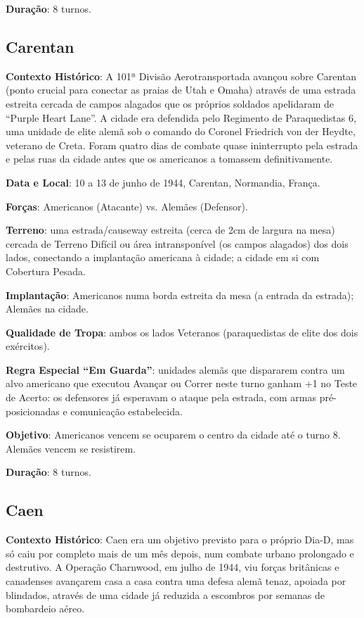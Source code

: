 \documentclass[11pt]{article}
\begin{document}
\textbf{Duração}: 8 turnos.

\subsection{Carentan}

\textbf{Contexto Histórico}: A 101ª Divisão Aerotransportada avançou sobre Carentan (ponto crucial para conectar as praias de Utah e Omaha) através de uma estrada estreita cercada de campos alagados que os próprios soldados apelidaram de ``Purple Heart Lane''. A cidade era defendida pelo Regimento de Paraquedistas 6, uma unidade de elite alemã sob o comando do Coronel Friedrich von der Heydte, veterano de Creta. Foram quatro dias de combate quase ininterrupto pela estrada e pelas ruas da cidade antes que os americanos a tomassem definitivamente.

\textbf{Data e Local}: 10 a 13 de junho de 1944, Carentan, Normandia, França.

\textbf{Forças}: Americanos (Atacante) vs. Alemães (Defensor).

\textbf{Terreno}: uma estrada/causeway estreita (cerca de 2cm de largura na mesa) cercada de Terreno Difícil ou área intransponível (os campos alagados) dos dois lados, conectando a implantação americana à cidade; a cidade em si com Cobertura Pesada.

\textbf{Implantação}: Americanos numa borda estreita da mesa (a entrada da estrada); Alemães na cidade.

\textbf{Qualidade de Tropa}: ambos os lados Veteranos (paraquedistas de elite dos dois exércitos).

\textbf{Regra Especial ``Em Guarda''}: unidades alemãs que dispararem contra um alvo americano que executou Avançar ou Correr neste turno ganham +1 no Teste de Acerto: os defensores já esperavam o ataque pela estrada, com armas pré-posicionadas e comunicação estabelecida.

\textbf{Objetivo}: Americanos vencem se ocuparem o centro da cidade até o turno 8. Alemães vencem se resistirem.

\textbf{Duração}: 8 turnos.

\subsection{Caen}

\textbf{Contexto Histórico}: Caen era um objetivo previsto para o próprio Dia-D, mas só caiu por completo mais de um mês depois, num combate urbano prolongado e destrutivo. A Operação Charnwood, em julho de 1944, viu forças britânicas e canadenses avançarem casa a casa contra uma defesa alemã tenaz, apoiada por blindados, através de uma cidade já reduzida a escombros por semanas de bombardeio aéreo.
\end{document}
